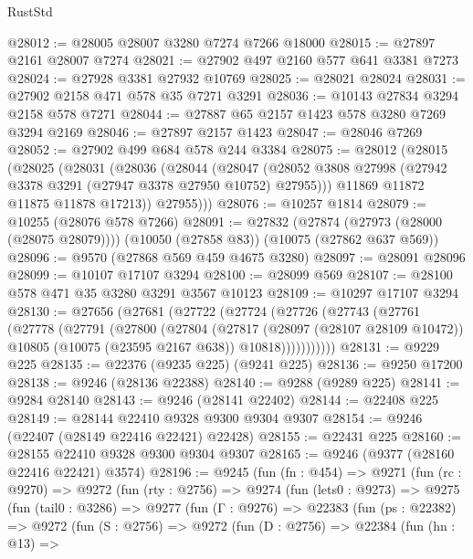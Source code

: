 \begin{lexlean}{RustStd}
\begin{coremodule}
@28012 := @28005 @28007 @3280 @7274 @7266 @18000
@28015 := @27897 @2161 @28007 @7274
@28021 := @27902 @497 @2160 @577 @641 @3381 @7273
@28024 := @27928 @3381 @27932 @10769
@28025 := @28021 @28024
@28031 := @27902 @2158 @471 @578 @35 @7271 @3291
@28036 := @10143 @27834 @3294 @2158 @578 @7271
@28044 := @27887 @65 @2157 @1423 @578 @3280 @7269 @3294 @2169
@28046 := @27897 @2157 @1423
@28047 := @28046 @7269
@28052 := @27902 @499 @684 @578 @244 @3384
@28075 := @28012
    (@28015
      (@28025
        (@28031
          (@28036
            (@28044
              (@28047
                (@28052 @3808 @27998 (@27942 @3378 @3291 (@27947 @3378 @27950 @10752) @27955)))
              @11869
              @11872
              @11875
              @11878
              @17213))
          @27955)))
@28076 := @10257 @1814
@28079 := @10255 (@28076 @578 @7266)
@28091 := @27832
    (@27874 (@27973 (@28000 (@28075 @28079))))
    (@10050 (@27858 @83))
    (@10075 (@27862 @637 @569))
@28096 := @9570 (@27868 @569 @459 @4675 @3280)
@28097 := @28091 @28096
@28099 := @10107 @17107 @3294
@28100 := @28099 @569
@28107 := @28100 @578 @471 @35 @3280 @3291 @3567 @10123
@28109 := @10297 @17107 @3294
@28130 := @27656
    (@27681
      (@27722
        (@27724
          (@27726
            (@27743
              (@27761
                (@27778
                  (@27791
                    (@27800
                      (@27804
                        (@27817
                          (@28097 (@28107 @28109 @10472))
                          @10805
                          (@10075 (@23595 @2167 @638))
                          @10818)))))))))))
@28131 := @9229 @225
@28135 := @22376 (@9235 @225) (@9241 @225)
@28136 := @9250 @17200
@28138 := @9246 (@28136 @22388)
@28140 := @9288 (@9289 @225)
@28141 := @9284 @28140
@28143 := @9246 (@28141 @22402)
@28144 := @22408 @225
@28149 := @28144 @22410 @9328 @9300 @9304 @9307
@28154 := @9246 (@22407 (@28149 @22416 @22421) @22428)
@28155 := @22431 @225
@28160 := @28155 @22410 @9328 @9300 @9304 @9307
@28165 := @9246 (@9377 (@28160 @22416 @22421) @3574)
@28196 := @9245
    (fun (fn : @454) =>
    @9271
      (fun (rc : @9270) =>
      @9272
        (fun (rty : @2756) =>
        @9274
          (fun (lets0 : @9273) =>
          @9275
            (fun (tail0 : @3286) =>
            @9277
              (fun (Γ : @9276) =>
              @22383
                (fun (ps : @22382) =>
                @9272
                  (fun (S : @2756) =>
                  @9272
                    (fun (D : @2756) =>
                    @22384
                      (fun (hn : @13) =>

\end{coremodule}
\end{lexlean}
